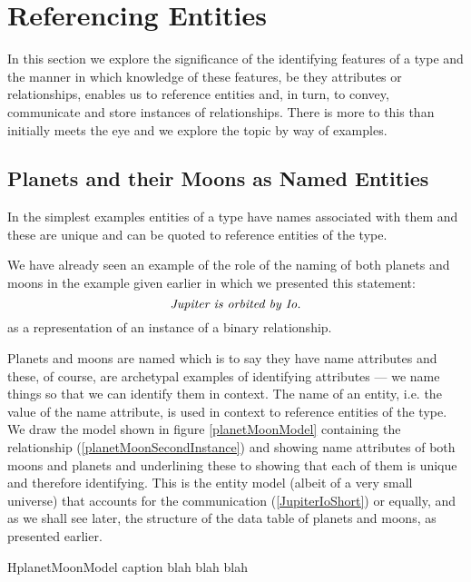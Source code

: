 \section{Referencing Entities}
\label{ReferencingEntities}

In this section we explore the significance of the identifying features
of a type and the manner in which knowledge of these features, 
be they attributes or relationships, enables us to 
reference entities and, in turn, 
to convey, communicate and store instances of relationships. 
There is more to this than initially meets the eye and we explore the topic
by way of examples. 

\subsection{Planets and their Moons as Named Entities}
\mynote {}
In the simplest examples entities of a type have names associated with them and these are unique and can be  quoted to reference entities of the type. 

We have already seen an example of the role of the naming of both planets and moons in the example given earlier 
 in which we presented this statement:
\begin{equation}
\label{JupiterIoShort}
\mbox{\textit{Jupiter is orbited by Io.}}
\end{equation}
as a representation of an instance of a binary relationship.
\iffalse
\begin{gather}
\label{planetMoonSecondInstance}
\raisebox{-1cm}{

}
\end{gather}
\fi

\mynote Planets and moons are named which is to say they have name attributes
and these, of course, are archetypal examples of identifying attributes --- we name things so that we can identify them in context. The name of an entity, i.e. the value of the name attribute,  is used in context to reference entities of the type.
 \mynote
We  draw the model shown in figure
\ref{planetMoonModel}
containing the relationship (\ref{planetMoonSecondInstance}) and showing name attributes of both moons and planets and
underlining these to showing that each of them is unique and therefore identifying. 
This is the entity model (albeit of a very small universe) that accounts for the communication (\ref{JupiterIoShort}) or equally, and as we shall see later, the structure of the data table of planets and moons, as presented earlier.
\begin{erboxedFigure} {H}{planetMoonModel}
{
caption blah blah blah
 }

\end{erboxedFigure}


